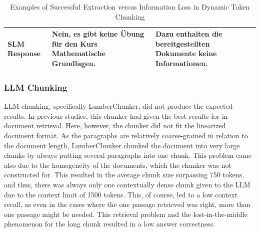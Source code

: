 \documentclass[12pt]{article} %
\begin{document}
\begin{table}[htbp]
\begin{tabularx}{\textwidth}{l X X}
        \midrule
        \textbf{SLM Response}                                                                                                                                                                                                                                                                                                                   &
        Nein, es gibt keine \"Ubung f\"ur den Kurs Mathematische Grundlagen.                                                                                                                                                                                                                                                                    &
        Dazu enthalten die bereitgestellten Dokumente keine Informationen.                                                                                                                                                                                                                                                                                                                                                                                                                                                                                                                                                                                                     \\
        \bottomrule
    \end{tabularx}
    \caption{Examples of Successful Extraction versus Information Loss in Dynamic Token Chunking}
    \label{tab:slm_evaluation_comparison_dynamic_token}
\end{table}
\subsubsection{LLM Chunking}
LLM chunking, specifically LumberChunker, did not produce the expected results. In previous studies, this chunker had given the best results for in-document retrieval. Here, however, the chunker did not fit the linearized document format. As the paragraphs are relatively coarse-grained in relation to the document length, LumberChunker chunked the document into very large chunks by always putting several paragraphs into one chunk. This problem came also due to the homogeneity of the documents, which the chunker was not constructed for.
This resulted in the average chunk size surpassing 750 tokens, and thus, there was always only one contextually dense chunk given to the LLM due to the context limit of 1500 tokens. This, of course, led to a low context recall, as even in the cases where the one passage retrieved was right, more than one passage might be needed. This retrieval problem and the lost-in-the-middle phenomenon for the long chunk resulted in a low answer correctness.
\end{document}
